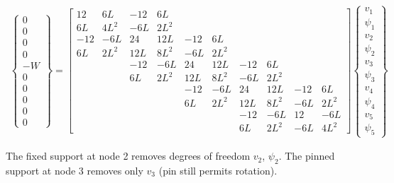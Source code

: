 \documentclass[10pt,letterpaper]{article}
\begin{document}
	\begin{align} 
		\begin{Bmatrix}
			0 \\
			0 \\
			0 \\
			0 \\
			-W \\
			0 \\
			0 \\
			0 \\
			0 \\
			0
		\end{Bmatrix} = \begin{bmatrix}
12 & 6L & -12 & 6L & & & & & & \\
6L & 4L^2 & -6L & 2L^2 & & & & & & \\
-12 & -6L & 24 & 12L & -12 & 6L & & & & \\
6L & 2L^2 & 12L & 8L^2 & -6L & 2L^2 & & & & \\
 & & -12 & -6L & 24 & 12L & -12 & 6L & & \\
 & & 6L & 2L^2 & 12L & 8L^2 & -6L & 2L^2 & & \\
 & & & & -12 & -6L & 24 & 12L & -12 & 6L \\
 & & & & 6L & 2L^2 & 12L & 8L^2 & -6L & 2L^2 \\
 & & & & & & -12 & -6L & 12 & -6L \\
 & & & & & & 6L & 2L^2 & -6L & 4L^2
		\end{bmatrix} \begin{Bmatrix}
			v_1 \\
			\psi_1 \\
			v_2 \\
			\psi_2 \\
			v_3 \\
			\psi_3 \\
			v_4 \\
			\psi_4 \\
			v_5 \\
			\psi_5
		\end{Bmatrix}
	\end{align}

	The fixed support at node 2 removes degrees of freedom $v_2$, $\psi_2$. The pinned support at node 3 removes only $v_3$ (pin still permits rotation).
\end{document}
